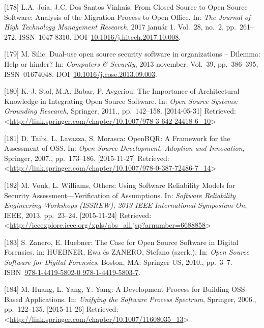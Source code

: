 \documentclass[12pt,magyar,a4paper,oneside]{scrreprt}
\newenvironment{cslreferences}%
  {}%
  {\par}
\begin{document}
\begin{cslreferences}
\leavevmode\hypertarget{ref-joia_closed_2017}{}%
{[}178{]} L.A. Joia, J.C. Dos Santos Vinhais: From Closed Source to Open
Source Software: Analysis of the Migration Process to Open Office. In:
\emph{The Journal of High Technology Management Research}, 2017 január
1. Vol.~28, no.~2, pp.~261--272, ISSN~1047-8310.
DOI~\href{https://doi.org/10.1016/j.hitech.2017.10.008}{10.1016/j.hitech.2017.10.008}.

\leavevmode\hypertarget{ref-silic_dual-use_2013}{}%
{[}179{]} M. Silic: Dual-use open source security software in
organizations -- Dilemma: Help or hinder? In: \emph{Computers \&
Security}, 2013 november. Vol.~39, pp.~386--395, ISSN~01674048.
DOI~\href{https://doi.org/10.1016/j.cose.2013.09.003}{10.1016/j.cose.2013.09.003}.

\leavevmode\hypertarget{ref-stol_importance_2011}{}%
{[}180{]} K.-J. Stol, M.A. Babar, P. Avgeriou: The Importance of
Architectural Knowledge in Integrating Open Source Software. In:
\emph{Open Source Systems: Grounding Research}, Springer, 2011.,
pp.~142--158. {[}2014-05-31{]} Retrieved:
\textless{}\url{http://link.springer.com/chapter/10.1007/978-3-642-24418-6_10}\textgreater{}

\leavevmode\hypertarget{ref-taibi_openbqr_2007}{}%
{[}181{]} D. Taibi, L. Lavazza, S. Morasca: OpenBQR: A Framework for the
Assessment of OSS. In: \emph{Open Source Development, Adoption and
Innovation}, Springer, 2007., pp.~173--186. {[}2015-11-27{]} Retrieved:
\textless{}\url{http://link.springer.com/chapter/10.1007/978-0-387-72486-7_14}\textgreater{}

\leavevmode\hypertarget{ref-vouk_using_2013}{}%
{[}182{]} M. Vouk, L. Williams, Others: Using Software Reliability
Models for Security Assessment---Verification of Assumptions. In:
\emph{Software Reliability Engineering Workshops (ISSREW), 2013 IEEE
International Symposium On}, IEEE, 2013. pp.~23--24. {[}2015-11-24{]}
Retrieved:
\textless{}\url{http://ieeexplore.ieee.org/xpls/abs_all.jsp?arnumber=6688858}\textgreater{}

\leavevmode\hypertarget{ref-huebner_case_2010}{}%
{[}183{]} S. Zanero, E. Huebner: The Case for Open Source Software in
Digital Forensics. in: HUEBNER, Ewa és ZANERO, Stefano (szerk.), In:
\emph{Open Source Software for Digital Forensics}, Boston, MA: Springer
US, 2010., pp.~3--7.
ISBN~\href{https://worldcat.org/isbn/978-1-4419-5802-0\%20978-1-4419-5803-7}{978-1-4419-5802-0 978-1-4419-5803-7}.

\leavevmode\hypertarget{ref-huang_development_2006}{}%
{[}184{]} M. Huang, L. Yang, Y. Yang: A Development Process for Building
OSS-Based Applications. In: \emph{Unifying the Software Process
Spectrum}, Springer, 2006., pp.~122--135. {[}2015-11-26{]} Retrieved:
\textless{}\url{http://link.springer.com/chapter/10.1007/11608035_13}\textgreater{}


\end{cslreferences}
\end{document}
